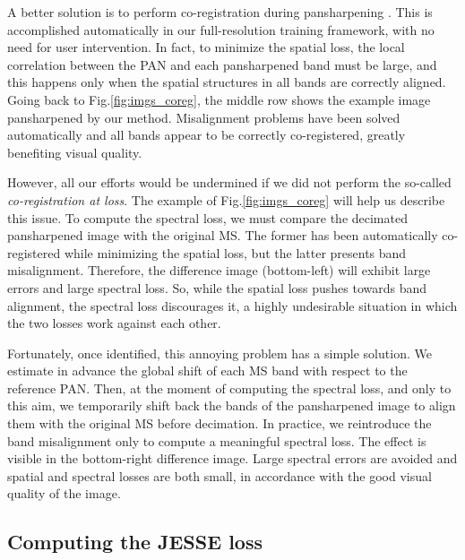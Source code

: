 \documentclass[journal]{IEEEtran}
\begin{document}
A better solution is to perform co-registration during pansharpening \cite{Ciotola2022, Seo2020, Lee2021}.
This is accomplished automatically in our full-resolution training framework, with no need for user intervention.
In fact, to minimize the spatial loss, the local correlation between the PAN and each pansharpened band must be large,
and this happens only when the spatial structures in all bands are correctly aligned.
Going back to Fig.\ref{fig:imgs_coreg}, the middle row shows the example image pansharpened by our method.
Misalignment problems have been solved automatically and all bands appear to be correctly co-registered, greatly benefiting visual quality.

However, all our efforts would be undermined if we did not perform the so-called {\em co-registration at loss}.
The example of Fig.\ref{fig:imgs_coreg} will help us describe this issue.
To compute the spectral loss, we must compare the decimated pansharpened image with the original MS.
The former has been automatically co-registered while minimizing the spatial loss, but the latter presents band misalignment.
Therefore, the difference image (bottom-left) will exhibit large errors and large spectral loss.
So, while the spatial loss pushes towards band alignment, the spectral loss discourages it,
a highly undesirable situation in which the two losses work against each other.

Fortunately, once identified, this annoying problem has a simple solution.
We estimate in advance the global shift of each MS band with respect to the reference PAN.
Then, at the moment of computing the spectral loss, and only to this aim, we temporarily shift back the bands of the pansharpened image to align them with the original MS before decimation.
In practice, we reintroduce the band misalignment only to compute a meaningful spectral loss.
The effect is visible in the bottom-right difference image.
Large spectral errors are avoided and spatial and spectral losses are both small, in accordance with the good visual quality of the image.


\subsection{Computing the JESSE loss}
\end{document}
